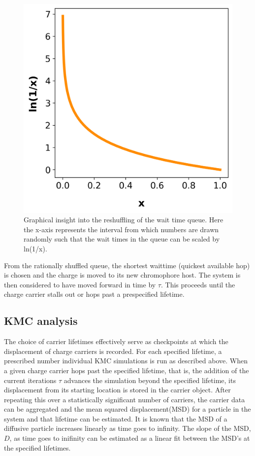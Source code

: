 \begin{figure}
  \center
  \includegraphics[width=0.8\linewidth]{figures/naturallog.png}
  \caption{Graphical insight into the reshuffling of the wait time queue. Here the x-axis represents the 
    interval from which numbers are drawn randomly such that the wait times in the queue can be scaled 
    by ln(1/x).}
  \label{fig:ln}
\end{figure}

From the rationally shuffled queue, the shortest waittime (quickest available hop) is chosen and the charge is moved to
its new chromophore host. The system is then considered to have moved forward in time by $\tau$. This proceeds
until the charge carrier stalls out or hops past a prespecified lifetime. 



\subsection{KMC analysis}

The choice of carrier lifetimes effectively serve as checkpoints at which the displacement of charge carriers is recorded. For
each specified lifetime, a prescribed number individual KMC simulations is run as described above. When a
given charge carrier hops past the specified lifetime, that is, the addition of the current iterations $\tau$ advances
the simulation beyond the specified lifetime,  its displacement from its starting location is stored in the carrier object. After repeating this over a
statistically significant number of carriers, the carrier data can be aggregated and the mean squared
displacement(MSD) for a particle in the system and that lifetime can be estimated.
It is known that the MSD of a diffusive particle increases linearly as time goes to infinity. 
The slope of the MSD, $D$,  as time
goes to inifinity can be estimated as a linear fit between the MSD's at the specified lifetimes.

